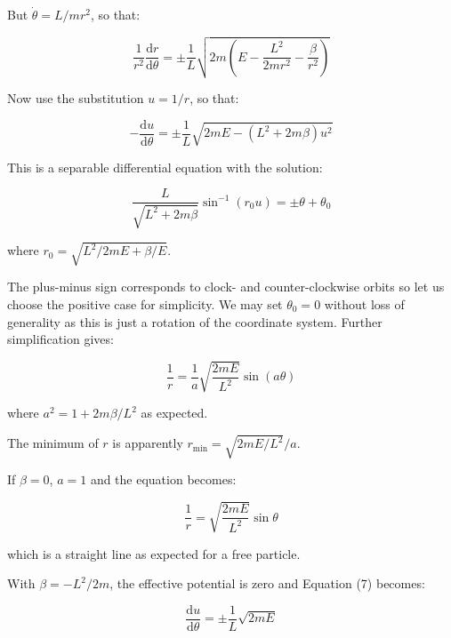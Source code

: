\documentclass[12pt]{article}
\begin{document}
But $\dot{\theta} = L/mr^{2}$, so that:

\begin{equation}
    \frac{1}{r^{2}} \frac{\mathrm{d}r}{\mathrm{d}\theta} = \pm\frac{1}{L} \sqrt{2m \left( E - \frac{L^{2}}{2mr^{2}} - \frac{\beta}{r^{2}} \right)}
\end{equation}

Now use the substitution $u = 1/r$, so that:

\begin{equation}
    -\frac{\mathrm{d}u}{\mathrm{d}\theta} = \pm\frac{1}{L} \sqrt{2mE - (L^{2} + 2m\beta)u^{2}}
\end{equation}

This is a separable differential equation with the solution:

\begin{equation}
    \frac{L}{\sqrt{L^{2} + 2m\beta}} \sin^{-1}{\left( r_{0}u \right)} = \pm\theta + \theta_{0}
\end{equation}

where $r_{0} = \sqrt{L^{2}/2mE + \beta/E}$.

The plus-minus sign corresponds to clock- and counter-clockwise orbits so let us choose the positive case for simplicity. We may set $\theta_{0} = 0$ without loss of generality as this is just a rotation of the coordinate system. Further simplification gives:

\begin{equation}
    \frac{1}{r} = \frac{1}{a} \sqrt{\frac{2mE}{L^{2}}} \sin{(a\theta)}
\end{equation}

where $a^{2} = 1 + 2m\beta/L^{2}$ as expected.

The minimum of $r$ is apparently $r_{\text{min}} = \sqrt{2mE/L^{2}}/a$.

If $\beta = 0$, $a = 1$ and the equation becomes:

\begin{equation}
    \frac{1}{r} = \sqrt{\frac{2mE}{L^{2}}} \sin{\theta}
\end{equation}

which is a straight line as expected for a free particle.

With $\beta = -L^{2}/2m$, the effective potential is zero and Equation (7) becomes:

\begin{equation}
    \frac{\mathrm{d}u}{\mathrm{d}\theta} = \pm\frac{1}{L} \sqrt{2mE}
\end{equation}
\end{document}
